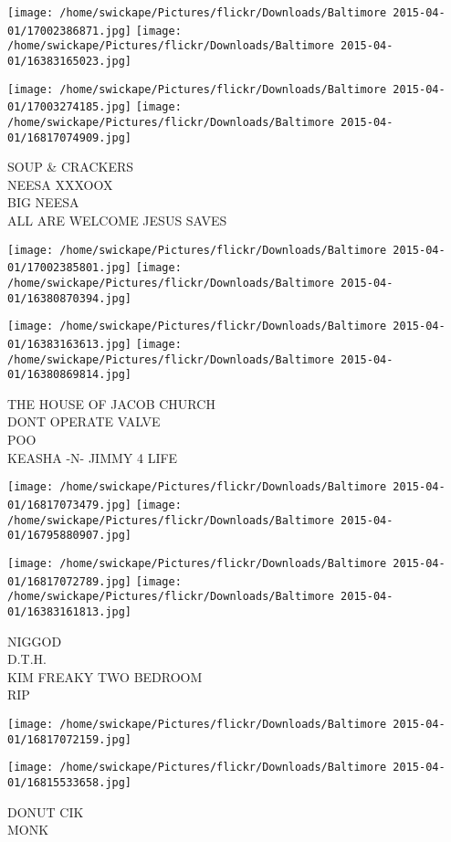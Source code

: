 \documentclass[10pt,letterpaper]{article}
\begin{document}
\texttt{[image: /home/swickape/Pictures/flickr/Downloads/Baltimore 2015-04-01/17002386871.jpg]}
\texttt{[image: /home/swickape/Pictures/flickr/Downloads/Baltimore 2015-04-01/16383165023.jpg]}

\texttt{[image: /home/swickape/Pictures/flickr/Downloads/Baltimore 2015-04-01/17003274185.jpg]}
\texttt{[image: /home/swickape/Pictures/flickr/Downloads/Baltimore 2015-04-01/16817074909.jpg]}

SOUP \& CRACKERS\\
NEESA XXXOOX\\
BIG NEESA\\
ALL ARE WELCOME JESUS SAVES
\pagebreak

\texttt{[image: /home/swickape/Pictures/flickr/Downloads/Baltimore 2015-04-01/17002385801.jpg]}
\texttt{[image: /home/swickape/Pictures/flickr/Downloads/Baltimore 2015-04-01/16380870394.jpg]}

\texttt{[image: /home/swickape/Pictures/flickr/Downloads/Baltimore 2015-04-01/16383163613.jpg]}
\texttt{[image: /home/swickape/Pictures/flickr/Downloads/Baltimore 2015-04-01/16380869814.jpg]}

THE HOUSE OF JACOB CHURCH\\
DONT OPERATE VALVE\\
POO\\
KEASHA {-}N{-} JIMMY 4 LIFE
\pagebreak

\texttt{[image: /home/swickape/Pictures/flickr/Downloads/Baltimore 2015-04-01/16817073479.jpg]}
\texttt{[image: /home/swickape/Pictures/flickr/Downloads/Baltimore 2015-04-01/16795880907.jpg]}

\texttt{[image: /home/swickape/Pictures/flickr/Downloads/Baltimore 2015-04-01/16817072789.jpg]}
\texttt{[image: /home/swickape/Pictures/flickr/Downloads/Baltimore 2015-04-01/16383161813.jpg]}

NIGGOD\\
D.T.H.\\
KIM FREAKY TWO BEDROOM\\
RIP
\pagebreak

\texttt{[image: /home/swickape/Pictures/flickr/Downloads/Baltimore 2015-04-01/16817072159.jpg]}

\vspace{0.25in}
\texttt{[image: /home/swickape/Pictures/flickr/Downloads/Baltimore 2015-04-01/16815533658.jpg]}

DONUT CIK\\
MONK
\pagebreak
\end{document}
